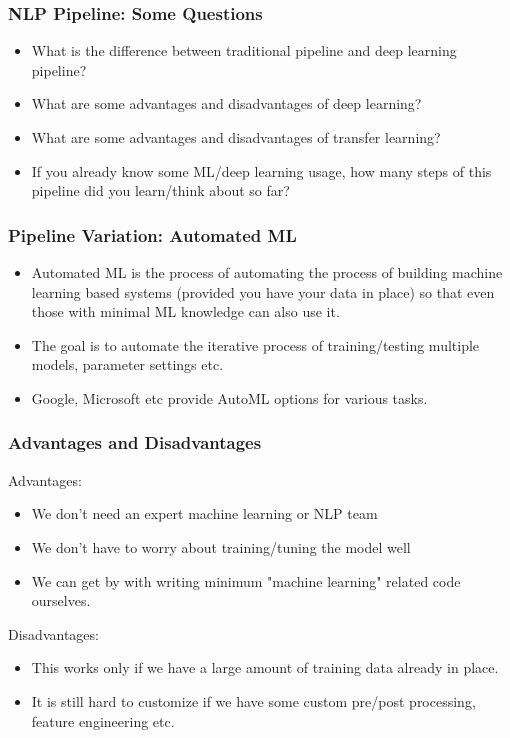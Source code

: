 \documentclass{beamer}
\begin{document}
\begin{frame}
\frametitle{NLP Pipeline: Some Questions}
\begin{itemize}
    \item What is the difference between traditional pipeline and deep learning pipeline?
\item What are some advantages and disadvantages of deep learning?
\item What are some advantages and disadvantages of transfer learning? 
\item If you already know some ML/deep learning usage, how many steps of this pipeline did you learn/think about so far? 
\end{itemize}
\end{frame}

\begin{frame}
\frametitle{Pipeline Variation: Automated ML}
\begin{itemize}
    \item Automated ML is the process of automating the process of building machine learning based systems (provided you have your data in place) so that even those with minimal ML knowledge can also use it.
    \item The goal is to automate the iterative process of training/testing multiple models, parameter settings etc.
    \item Google, Microsoft etc provide AutoML options for various tasks. 
\end{itemize}
\end{frame}

\begin{frame}
\frametitle{Advantages and Disadvantages}
Advantages:
\begin{itemize}
    \item We don't need an expert machine learning or NLP team
    \item We don't have to worry about training/tuning the model well
    \item We can get by with writing minimum "machine learning" related code ourselves.
\end{itemize}
Disadvantages:
\begin{itemize}
    \item This works only if we have a large amount of training data already in place.
    \item It is still hard to customize if we have some custom pre/post processing, feature engineering etc. 
\end{itemize}
\end{frame}
\end{document}
